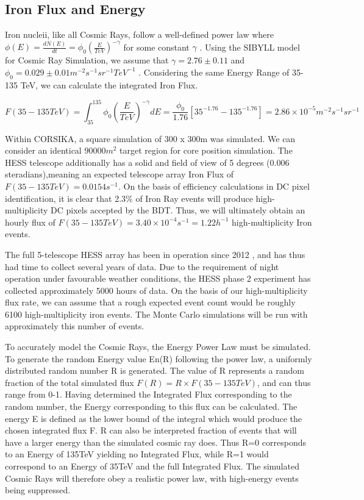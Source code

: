 \documentclass[11pt]{article}
\begin{document}
\subsection{Iron Flux and Energy}
Iron nucleii, like all Cosmic Rays, follow a well-defined power law where $\phi(E) = \frac{dN(E)}{dt} = \phi_{0} (\frac{E}{TeV})^{-\gamma} $ for some constant $\gamma$ \cite{hess07}. Using the SIBYLL model for Cosmic Ray Simulation, we assume that $ \gamma = 2.76 \pm 0.11 $ and $\phi_{0}=0.029 \pm 0.01 m^{-2} s^{-1} sr^{-1} TeV ^{-1}$ \cite{hess07}. Considering the same Energy Range of 35-135 TeV, we can calculate the integrated Iron Flux. 

\[ F(35-135TeV) = \int_{35}^{135} \phi_{0} (\frac{E}{TeV})^{-\gamma} dE = \frac{\phi_{0}}{1.76}[35^{-1.76} - 135^{-1.76}] = 2.86 \times 10^{-5} m^{-2} s^{-1} sr^{-1}\]

Within CORSIKA, a square simulation of 300 x 300m was simulated. We can consider an identical $90000 m^{2}$ target region for core position simulation. The HESS telescope additionally has a solid and field of view of 5 degrees (0.006 steradians),meaning an expected telescope array Iron Flux of $F(35-135TeV) = 0.0154 s^{-1}$. On the basis of efficiency calculations in DC pixel identification, it is clear that 2.3\% of Iron Ray events will produce high-multiplicity DC pixels accepted by the BDT. Thus, we will ultimately obtain an hourly flux of $F(35-135TeV) = 3.40 \times 10^{-4} s^{-1} = 1.22 h^{-1}$ high-multiplicity Iron events. 

The full 5-telescope HESS array has been in operation since 2012 \cite{hessCT5}, and has thus had time to collect several years of data. Due to the requirement of night operation under favourable weather conditions, the HESS phase 2 experiment has collected approximately 5000 hours of data. On the basis of our high-multiplicity flux rate, we can assume that a rough expected event count would be roughly 6100 high-multiplicity iron events. The Monte Carlo simulations will be run with approximately this number of events.

To accurately model the Cosmic Rays, the Energy Power Law must be simulated. To generate the random Energy value En(R) following the power law, a uniformly distributed random number R is generated. The value of R represents a random fraction of the total simulated flux $ F(R) = R \times F(35-135TeV) $, and can thus range from 0-1. Having determined the Integrated Flux corresponding to the random number, the Energy corresponding to this flux can be calculated. The energy E is defined as the lower bound of the integral which would produce the chosen integrated flux F. R can also be interpreted fraction of events that will have a larger energy than the simulated cosmic ray does. Thus R=0 corresponds to an Energy of 135TeV yielding no Integrated Flux, while R=1 would correspond to an Energy of 35TeV and the full Integrated Flux. The simulated Cosmic Rays will therefore obey a realistic power law, with high-energy events being suppressed.
\end{document}
